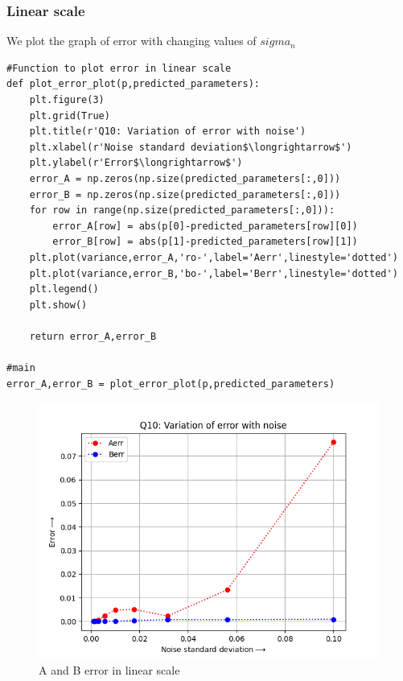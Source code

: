 \documentclass[11pt, a4paper]{article}
\begin{document}
\subsubsection{Linear scale}
We plot the graph of error with changing values of $sigma_{n}$
\begin{lstlisting}
#Function to plot error in linear scale
def plot_error_plot(p,predicted_parameters):
	plt.figure(3)
	plt.grid(True)
	plt.title(r'Q10: Variation of error with noise')
	plt.xlabel(r'Noise standard deviation$\longrightarrow$')
	plt.ylabel(r'Error$\longrightarrow$')
	error_A = np.zeros(np.size(predicted_parameters[:,0]))
	error_B = np.zeros(np.size(predicted_parameters[:,0]))
	for row in range(np.size(predicted_parameters[:,0])):
		error_A[row] = abs(p[0]-predicted_parameters[row][0])
		error_B[row] = abs(p[1]-predicted_parameters[row][1])
	plt.plot(variance,error_A,'ro-',label='Aerr',linestyle='dotted')
	plt.plot(variance,error_B,'bo-',label='Berr',linestyle='dotted')
	plt.legend()
	plt.show()

	return error_A,error_B

#main
error_A,error_B = plot_error_plot(p,predicted_parameters)
\end{lstlisting}

\begin{figure}[!tbh]
   	\centering
   	\includegraphics[scale=0.7]{Q10.png}  %
   	\caption{A and B error in linear scale}
   	\label{fig:A and B err in linear scale}
\end{figure}
   
\end{document}
